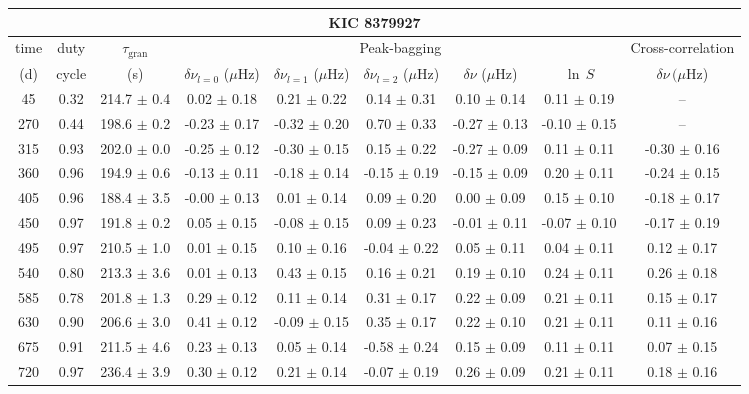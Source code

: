 \documentclass[twocolumn]{aastex61}%
\begin{document}
\begin{table*}[ht]\centering\fontsize{9.}{7.}\selectfont
\begin{tabular}{ccc|ccccc|c}
\multicolumn{9}{c}{KIC 8379927}\\ \hline\hline
time & duty & $\tau_\text{gran}$ &\multicolumn{5}{c|}{Peak-bagging}&Cross-correlation\\
(d)& cycle & (s)&$\delta\nu_{l=0}$ ($\mu$Hz) & $\delta\nu_{l=1}$ ($\mu$Hz) & $\delta\nu_{l=2}$ ($\mu$Hz) & $\delta\nu$ ($\mu$Hz)& $\ln\,S$ & $\delta\nu\,(\mu$Hz)\\\hline
45 & 0.32 & 214.7 $\pm$ 0.4 & 0.02 $\pm$ 0.18 & 0.21 $\pm$ 0.22 & 0.14 $\pm$ 0.31 & 0.10 $\pm$ 0.14 & 0.11 $\pm$ 0.19 & --\\
270 & 0.44 & 198.6 $\pm$ 0.2 & -0.23 $\pm$ 0.17 & -0.32 $\pm$ 0.20 & 0.70 $\pm$ 0.33 & -0.27 $\pm$ 0.13 & -0.10 $\pm$ 0.15 & --\\
315 & 0.93 & 202.0 $\pm$ 0.0 & -0.25 $\pm$ 0.12 & -0.30 $\pm$ 0.15 & 0.15 $\pm$ 0.22 & -0.27 $\pm$ 0.09 & 0.11 $\pm$ 0.11 & -0.30 $\pm$ 0.16\\
360 & 0.96 & 194.9 $\pm$ 0.6 & -0.13 $\pm$ 0.11 & -0.18 $\pm$ 0.14 & -0.15 $\pm$ 0.19 & -0.15 $\pm$ 0.09 & 0.20 $\pm$ 0.11 & -0.24 $\pm$ 0.15\\
405 & 0.96 & 188.4 $\pm$ 3.5 & -0.00 $\pm$ 0.13 & 0.01 $\pm$ 0.14 & 0.09 $\pm$ 0.20 & 0.00 $\pm$ 0.09 & 0.15 $\pm$ 0.10 & -0.18 $\pm$ 0.17\\
450 & 0.97 & 191.8 $\pm$ 0.2 & 0.05 $\pm$ 0.15 & -0.08 $\pm$ 0.15 & 0.09 $\pm$ 0.23 & -0.01 $\pm$ 0.11 & -0.07 $\pm$ 0.10 & -0.17 $\pm$ 0.19\\
495 & 0.97 & 210.5 $\pm$ 1.0 & 0.01 $\pm$ 0.15 & 0.10 $\pm$ 0.16 & -0.04 $\pm$ 0.22 & 0.05 $\pm$ 0.11 & 0.04 $\pm$ 0.11 & 0.12 $\pm$ 0.17\\
540 & 0.80 & 213.3 $\pm$ 3.6 & 0.01 $\pm$ 0.13 & 0.43 $\pm$ 0.15 & 0.16 $\pm$ 0.21 & 0.19 $\pm$ 0.10 & 0.24 $\pm$ 0.11 & 0.26 $\pm$ 0.18\\
585 & 0.78 & 201.8 $\pm$ 1.3 & 0.29 $\pm$ 0.12 & 0.11 $\pm$ 0.14 & 0.31 $\pm$ 0.17 & 0.22 $\pm$ 0.09 & 0.21 $\pm$ 0.11 & 0.15 $\pm$ 0.17\\
630 & 0.90 & 206.6 $\pm$ 3.0 & 0.41 $\pm$ 0.12 & -0.09 $\pm$ 0.15 & 0.35 $\pm$ 0.17 & 0.22 $\pm$ 0.10 & 0.21 $\pm$ 0.11 & 0.11 $\pm$ 0.16\\
675 & 0.91 & 211.5 $\pm$ 4.6 & 0.23 $\pm$ 0.13 & 0.05 $\pm$ 0.14 & -0.58 $\pm$ 0.24 & 0.15 $\pm$ 0.09 & 0.11 $\pm$ 0.11 & 0.07 $\pm$ 0.15\\
720 & 0.97 & 236.4 $\pm$ 3.9 & 0.30 $\pm$ 0.12 & 0.21 $\pm$ 0.14 & -0.07 $\pm$ 0.19 & 0.26 $\pm$ 0.09 & 0.21 $\pm$ 0.11 & 0.18 $\pm$ 0.16\\

\end{tabular}
\end{table*}
\end{document}
